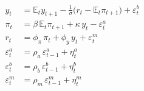 
\begin{align}
  y_{t}    &= \mathbb{E}_{t} y_{t+1} - \frac{1}{\sigma}\bigl(r_{t} - \mathbb{E}_{t}\pi_{t+1}\bigr) + \varepsilon_{t}^{b}
              \label{eq:nk-is} \\
  \pi_{t}  &= \beta\, \mathbb{E}_{t}\pi_{t+1} + \kappa\, y_{t} - \varepsilon_{t}^{a}
              \label{eq:nk-nkpc} \\
  r_{t}    &= \phi_{\pi}\, \pi_{t} + \phi_{y}\, y_{t} + \varepsilon_{t}^{m}
              \label{eq:nk-taylor} \\
  \varepsilon_{t}^{a} &= \rho_{a}\, \varepsilon_{t-1}^{a} + \eta_{t}^{a}
              \label{eq:nk-ar-a} \\
  \varepsilon_{t}^{b} &= \rho_{b}\, \varepsilon_{t-1}^{b} + \eta_{t}^{b}
              \label{eq:nk-ar-b} \\
  \varepsilon_{t}^{m} &= \rho_{m}\, \varepsilon_{t-1}^{m} + \eta_{t}^{m}
              \label{eq:nk-ar-m}
\end{align}

